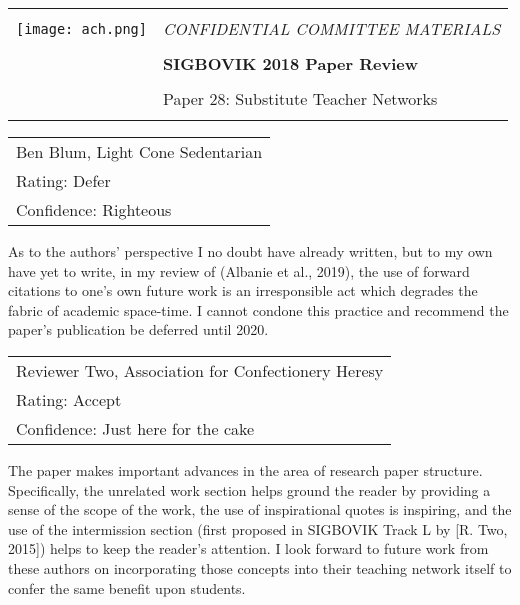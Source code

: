 \documentclass[12pt]{article}
\begin{document}
{\sffamily
\begin{tabular}{ll}
\multirow{3}{*}{\texttt{[image: ach.png]}}\\
& \Large{\em CONFIDENTIAL COMMITTEE MATERIALS} \\
&\\
& \textbf{\Huge{SIGBOVIK 2018 Paper Review}} \\
&\\
& \LARGE{Paper 28: Substitute Teacher Networks} \\
&\\
\hline
\end{tabular}}
\vspace{2em}
\thispagestyle{empty}

{\large\bf
\begin{tabular}{l}
Ben Blum, Light Cone Sedentarian \\
Rating: Defer \\
Confidence: Righteous \\
\end{tabular}}
\vspace{1em}

As to the authors' perspective I no doubt have already written, but to my own have yet to write,
in my review of (Albanie et al., 2019),
the use of forward citations to one's own future work is an irresponsible act
which degrades the fabric of academic space-time.
I cannot condone this practice %
and recommend the paper's publication be deferred until 2020.

\vspace{3em}

{\large\bf
\begin{tabular}{l}
Reviewer Two, Association for Confectionery Heresy \\
Rating: Accept \\
Confidence: Just here for the cake \\
\end{tabular}}
\vspace{1em}

The paper makes important advances in the area of research paper structure.
Specifically, the unrelated work section helps ground the reader by providing a sense of the scope of the work,
the use of inspirational quotes is inspiring,
and the use of the intermission section (first proposed in SIGBOVIK Track L by [R. Two, 2015])
helps to keep the reader's attention.
I look forward to future work from these authors on incorporating those concepts into their teaching network itself
to confer the same benefit upon students.
\end{document}
